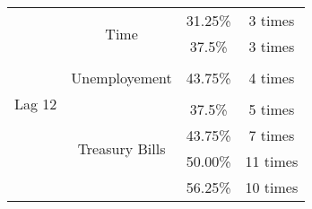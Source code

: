\begin{table}[t]
\begin{tabular}{lccc}
    \multicolumn{1}{c|}{\multirow{9}{*}{Lag 12}}     & \multirow{2}{*}{Time}             & 31.25\%                   & 3 times \\
    \multicolumn{1}{c|}{}                           &                                   & 37.5\%                    & 3 times \\
    \multicolumn{1}{c|}{}                           &                                   &                           &          \\    
    \multicolumn{1}{c|}{}                           & Unemployement                     & 43.75\%                   & 4 times \\
    \multicolumn{1}{c|}{}                           &                                   &                           &          \\    
    \multicolumn{1}{c|}{}                           & \multirow{4}{*}{Treasury Bills}   & 37.5\%                    & 5 times \\
    \multicolumn{1}{c|}{}                           &                                   & 43.75\%                   & 7 times  \\
    \multicolumn{1}{c|}{}                           &                                   & 50.00\%                   & 11 times  \\ 
    \multicolumn{1}{c|}{}                           &                                   & 56.25\%                   & 10 times  \\ 

    \bottomrule
  \end{tabular}
  \label{table:OptimalSplitsUK}
  \vspace{1em}  
\end{table}


